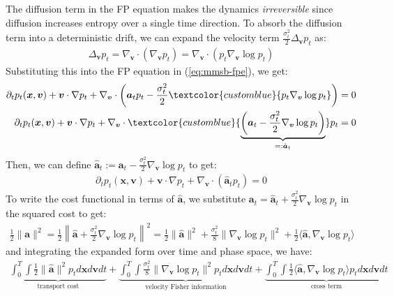 \documentclass{article}
\newcommand{\bluetext}[1]{\textcolor{customblue}{#1}}
\begin{document}
The diffusion term in the FP equation makes the dynamics \textit{irreversible} since diffusion increases entropy over a single time direction. To absorb the diffusion term into a deterministic drift, we can expand the velocity term $\frac{\sigma_t^2}{2}\Delta_{\boldsymbol{v}}p_t$ as:
\begin{align}
    \Delta_{\boldsymbol{v}}p_t=\nabla_{\boldsymbol{v}} \cdot (\nabla _{\boldsymbol{v}}p_t)=\nabla_{\boldsymbol{v}}\cdot (p_t\nabla_{\boldsymbol{v}} \log p_t)
\end{align}
Substituting this into the FP equation in (\ref{eq:mmsb-fpe}), we get:
\begin{align}
    \partial_tp_t(\boldsymbol{x},\boldsymbol{v})+\boldsymbol{v}\cdot \nabla p_t+\nabla_{\boldsymbol{v}}\cdot \left(\boldsymbol{a}_tp_t-\frac{\sigma_t^2}{2}\bluetext{p_t\nabla_{\boldsymbol{v}}\log p_t}\right)&=0\nonumber\\
    \partial_tp_t(\boldsymbol{x},\boldsymbol{v})+\boldsymbol{v}\cdot \nabla p_t+\nabla_{\boldsymbol{v}}\cdot \bluetext{\underbrace{\left(\boldsymbol{a}_t-\frac{\sigma_t^2}{2}\nabla_{\boldsymbol{v}}\log p_t\right)}_{=:\hat{\boldsymbol{a}}_t}}p_t&=0
\end{align}
Then, we can define $\hat{\boldsymbol{a}}_t:=\boldsymbol{a}_t-\frac{\sigma_t^2}{2}\nabla_{\boldsymbol{v}}\log p_t$ to get:
\begin{align}
    \partial_tp_t(\boldsymbol{x},\boldsymbol{v})+\boldsymbol{v}\cdot \nabla p_t+\nabla_{\boldsymbol{v}}\cdot (\hat{\boldsymbol{a}}_tp_t)=0\label{eq:continuity-ahat}
\end{align}
To write the cost functional in terms of $\hat{\boldsymbol{a}}$, we substitute $\boldsymbol{a}_t=\hat{\boldsymbol{a}}_t+\frac{\sigma_t^2}{2}\nabla_{\boldsymbol{v}}\log p_t$ in the squared cost to get:
\begin{align}
    \frac{1}{2}\|\boldsymbol{a}\|^2 =\frac{1}{2}\left\|\hat{\boldsymbol{a}}+\frac{\sigma_t^2}{2}\nabla_{\boldsymbol{v}}\log p_t\right\|^2=\frac{1}{2}\|\hat{\boldsymbol{a}}\|^2 +\frac{\sigma_t^2}{8}\|\nabla_{\boldsymbol{v}}\log p_t\|^2+\frac{1}{2}\langle \hat{\boldsymbol{a}}, \nabla_{\boldsymbol{v}}\log p_t\rangle
\end{align}
and integrating the expanded form over time and phase space, we have:
\begin{align}
    \underbrace{\int_0^T\int\frac{1}{2}\|\hat{\boldsymbol{a}}\|^2 p_td\boldsymbol{x}d\boldsymbol{v}dt}_{\text{transport cost}}+\underbrace{\int_0^T\int\frac{\sigma_t^2}{8}\|\nabla_{\boldsymbol{v}}\log p_t\|^2p_td\boldsymbol{x}d\boldsymbol{v}dt}_{\text{velocity Fisher information}}+\underbrace{\int_0^T\int\frac{1}{2}\langle \hat{\boldsymbol{a}}, \nabla_{\boldsymbol{v}}\log p_t\rangle p_td\boldsymbol{x}d\boldsymbol{v}dt}_{\text{cross term}}\label{eq:expanded-squared-a}
\end{align}
\end{document}
